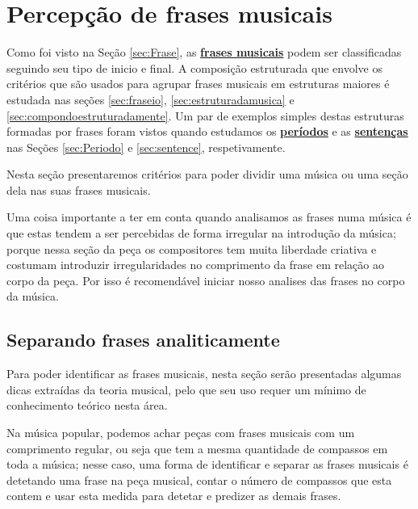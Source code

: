 \newpage
\section{Percepção de frases musicais}
\label{sec:perceberfrases}

Como foi visto na Seção \ref{sec:Frase}, 
as \hyperref[sec:Frase]{\textbf{frases musicais}} podem ser classificadas seguindo seu tipo de inicio e final. 
A composição estruturada que envolve os critérios que são usados para agrupar frases musicais em estruturas maiores 
é estudada nas seções \ref{sec:fraseio}, \ref{sec:estruturadamusica} e \ref{sec:compondoestruturadamente}. 
Um par de exemplos simples destas estruturas formadas por frases 
foram vistos quando estudamos os \hyperref[sec:Periodo]{\textbf{períodos}} e 
as \hyperref[sec:sentence]{\textbf{sentenças}} nas Seções \ref{sec:Periodo} e \ref{sec:sentence}, 
respetivamente.

Nesta seção presentaremos critérios para poder dividir uma música ou uma seção dela 
nas suas frases musicais. 


\begin{tcbattention}
Uma coisa importante a ter em conta quando analisamos as frases numa música 
é que estas tendem a ser percebidas de forma irregular na introdução da música;
porque nessa seção da peça os compositores tem muita liberdade criativa
e costumam introduzir irregularidades no comprimento da frase em relação ao corpo da peça. 
Por isso é recomendável iniciar nosso analises das frases no corpo da música. 
\end{tcbattention}

\subsection{Separando frases analiticamente}

Para poder identificar as frases musicais,
nesta seção serão presentadas algumas dicas extraídas da teoria musical,
pelo que seu uso requer um mínimo de conhecimento teórico nesta área. 




Na música popular, podemos achar peças com frases musicais com um comprimento regular,
ou seja que  tem a mesma quantidade de compassos em toda a música;
nesse caso, uma forma de identificar e separar as frases musicais  
é detetando uma frase na peça musical,
contar o número de compassos que esta contem  
e usar esta medida para detetar e predizer as demais frases.


